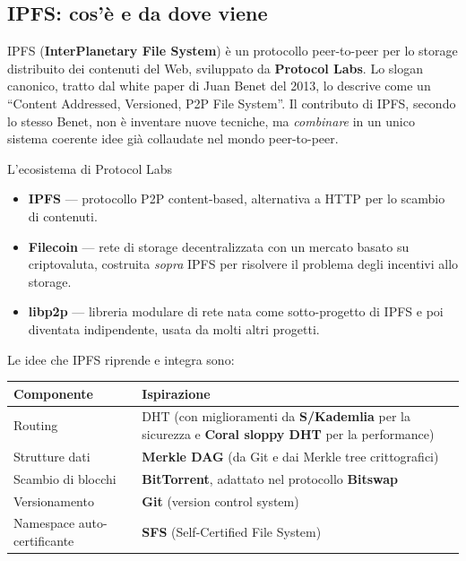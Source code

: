 \documentclass[
  italian,
  openany]{book}
\newcounter{none} %
\providecommand{\tightlist}{%
  \setlength{\itemsep}{0pt}\setlength{\parskip}{0pt}}
\begin{document}
\subsection{IPFS: cos'è e da dove
viene}\label{ipfs-cosuxe8-e-da-dove-viene}

IPFS (\textbf{InterPlanetary File System}) è un protocollo peer-to-peer
per lo storage distribuito dei contenuti del Web, sviluppato da
\textbf{Protocol Labs}. Lo slogan canonico, tratto dal white paper di
Juan Benet del 2013, lo descrive come un ``Content Addressed, Versioned,
P2P File System''. Il contributo di IPFS, secondo lo stesso Benet, non è
inventare nuove tecniche, ma \emph{combinare} in un unico sistema
coerente idee già collaudate nel mondo peer-to-peer.

\begin{calloutnote}{L’ecosistema di Protocol Labs}

\begin{itemize}
\tightlist
\item
  \textbf{IPFS} --- protocollo P2P content-based, alternativa a HTTP per
  lo scambio di contenuti.
\item
  \textbf{Filecoin} --- rete di storage decentralizzata con un mercato
  basato su criptovaluta, costruita \emph{sopra} IPFS per risolvere il
  problema degli incentivi allo storage.
\item
  \textbf{libp2p} --- libreria modulare di rete nata come sotto-progetto
  di IPFS e poi diventata indipendente, usata da molti altri progetti.
\end{itemize}

\end{calloutnote}

Le idee che IPFS riprende e integra sono:

{\def\LTcaptype{none} %
\begin{longtable}[]{@{}
  >{\raggedright\arraybackslash}p{}
  >{\raggedright\arraybackslash}p{}@{}}
\toprule\noalign{}
\begin{minipage}[b]{\linewidth}\raggedright
Componente
\end{minipage} & \begin{minipage}[b]{\linewidth}\raggedright
Ispirazione
\end{minipage} \\
\midrule\noalign{}
\endhead
\bottomrule\noalign{}
\endlastfoot
Routing & DHT (con miglioramenti da \textbf{S/Kademlia} per la sicurezza
e \textbf{Coral sloppy DHT} per la performance) \\
Strutture dati & \textbf{Merkle DAG} (da Git e dai Merkle tree
crittografici) \\
Scambio di blocchi & \textbf{BitTorrent}, adattato nel protocollo
\textbf{Bitswap} \\
Versionamento & \textbf{Git} (version control system) \\
Namespace auto-certificante & \textbf{SFS} (Self-Certified File
System) \\
\end{longtable}
}
\end{document}

